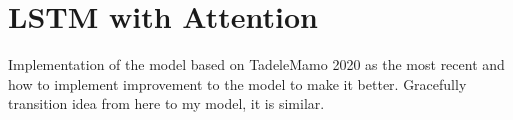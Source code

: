 \section{LSTM with Attention}\label{sec:lstm-attention}
Implementation of the model based on TadeleMamo 2020 as the most recent and how to implement improvement to the model to make it better. Gracefully transition idea from here to my model, it is similar.